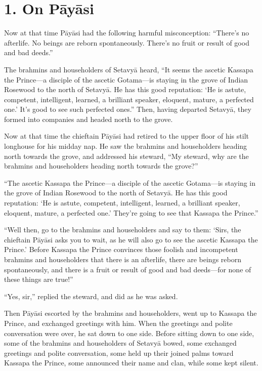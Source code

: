 \documentclass[12pt,openany]{book}%
\begin{document}
\section*{1. On \textsanskrit{Pāyāsi} }

Now at that time \textsanskrit{Pāyāsi} had the following harmful misconception: “There’s no afterlife. No beings are reborn spontaneously. There’s no fruit or result of good and bad deeds.” 

The brahmins and householders of \textsanskrit{Setavyā} heard, “It seems the ascetic Kassapa the Prince—a disciple of the ascetic Gotama—is staying in the grove of Indian Rosewood to the north of \textsanskrit{Setavyā}. He has this good reputation: ‘He is astute, competent, intelligent, learned, a brilliant speaker, eloquent, mature, a perfected one.’ It’s good to see such perfected ones.” Then, having departed \textsanskrit{Setavyā}, they formed into companies and headed north to the grove. 

Now at that time the chieftain \textsanskrit{Pāyāsi} had retired to the upper floor of his stilt longhouse for his midday nap. He saw the brahmins and householders heading north towards the grove, and addressed his steward, “My steward, why are the brahmins and householders heading north towards the grove?” 

“The ascetic Kassapa the Prince—a disciple of the ascetic Gotama—is staying in the grove of Indian Rosewood to the north of \textsanskrit{Setavyā}. He has this good reputation: ‘He is astute, competent, intelligent, learned, a brilliant speaker, eloquent, mature, a perfected one.’ They’re going to see that Kassapa the Prince.” 

“Well then, go to the brahmins and householders and say to them: ‘Sirs, the chieftain \textsanskrit{Pāyāsi} asks you to wait, as he will also go to see the ascetic Kassapa the Prince.’ Before Kassapa the Prince convinces those foolish and incompetent brahmins and householders that there is an afterlife, there are beings reborn spontaneously, and there is a fruit or result of good and bad deeds—for none of these things are true!” 

“Yes, sir,” replied the steward, and did as he was asked. 

Then \textsanskrit{Pāyāsi} escorted by the brahmins and householders, went up to Kassapa the Prince, and exchanged greetings with him. When the greetings and polite conversation were over, he sat down to one side. Before sitting down to one side, some of the brahmins and householders of \textsanskrit{Setavyā} bowed, some exchanged greetings and polite conversation, some held up their joined palms toward Kassapa the Prince, some announced their name and clan, while some kept silent. 
\end{document}
